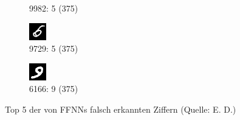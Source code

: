 \documentclass[
	a4paper,
	12pt,
	ngerman,
	oneside
]{scrreprt}											%
\begin{document}
\begin{figure}[h]
\begin{subfigure}[t]{.19\linewidth}
					\caption{9982: 5 (375)}
				\end{subfigure}
				\begin{subfigure}[t]{.19\linewidth}
					\centering
					\includegraphics[height=0.6\linewidth]{imagesAndGraphData/top5FFNN/5-9729.png}
					\caption{9729: 5 (375)}
				\end{subfigure}
				\begin{subfigure}[t]{.19\linewidth}
					\centering
					\includegraphics[height=0.6\linewidth]{imagesAndGraphData/top5FFNN/9-6166.png}
					\caption{6166: 9 (375)}
				\end{subfigure}
				
				\vspace*{-2mm}
				\caption{Top 5 der von FFNNs falsch erkannten Ziffern (Quelle: E. D.)}\label{top5FFNN}
			\end{figure}
			\vspace*{-3mm}
\end{document}

